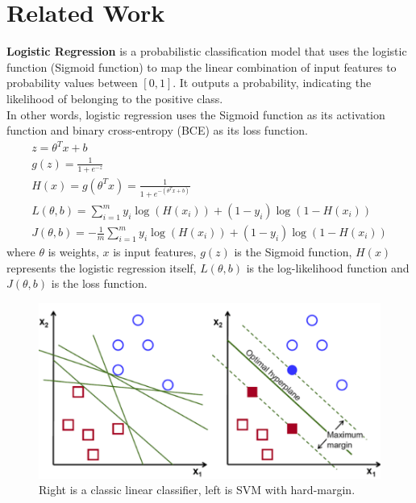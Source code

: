\documentclass[10pt,twocolumn,letterpaper]{article}
\begin{document}
\section{Related Work}
\label{sec:related}

\noindent\textbf{Logistic Regression} is a probabilistic classification model that uses the logistic function (Sigmoid function) to map the linear combination of input features to probability values between $[0, 1]$.
It outputs a probability, indicating the likelihood of belonging to the positive class\cite{wright1995logistic}. \\
\indent In other words, logistic regression uses the Sigmoid function as its activation function and binary cross-entropy (BCE) as its loss function.
\begin{equation*}\label{eq:logistic}
	\begin{gathered}
		z = \theta^{T}{x}+b \\
		g(z) = \frac{1}{1+e^{-z}} \\
		H(x) = g(\theta^{T}{x}) = \frac{1}{1+e^{-(\theta^{T}{x}+b)}} \\
		L(\theta,b) = \sum^{m}_{i=1}y_{i}\log({H(x_{i})})+(1-y_{i})\log(1-H(x_i)) \\
		J(\theta,b) = -\frac{1}{m}\sum^{m}_{i=1}y_{i}\log({H(x_{i})})+(1-y_{i})\log(1-H(x_i))
	\end{gathered}
\end{equation*}
where $\theta$ is weights, $x$ is input features, $g(z)$ is the Sigmoid function, $H(x)$ represents the logistic regression itself, $L(\theta,b)$ is the log-likelihood function and $J(\theta,b)$ is the loss function.\\
\begin{figure}[t]
	\centering
	\includegraphics[width=\columnwidth]{svm-lr}
	\caption{Right is a classic linear classifier, left is SVM with hard-margin.}
	\label{fig:svm-lr}
\end{figure}
\end{document}
